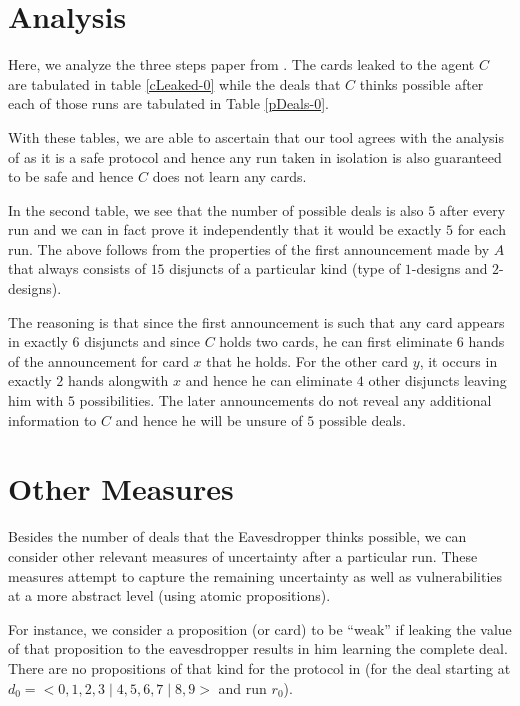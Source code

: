 \documentclass{article}
\begin{document}
\section{Analysis}

Here, we analyze the three steps paper from 
\cite{ditmarsch:2011}. The cards leaked to the
agent $C$ are tabulated in table \ref{cLeaked-0}
while the deals that $C$ thinks possible after
each of those runs are tabulated in Table \ref{pDeals-0}.

With these tables, we are able to ascertain that 
our tool agrees with the analysis of \cite{ditmarsch:2011}
as it is a safe protocol and hence any run taken in
isolation is also guaranteed to be safe and hence $C$
does not learn any cards.

\begin{table}[h]
\hfill \quad \hfill
\end{table}

In the second table, we see that the number of possible
deals is also $5$ after every run and we can in fact prove
it independently that it would be exactly $5$ for each run. 
The above follows from the properties of the first announcement
made by $A$ that always consists of $15$ disjuncts of a
particular kind (type of $1$-designs and $2$-designs). 

The reasoning is that since the first announcement
is such that any card appears in exactly $6$ disjuncts and since
$C$ holds two cards, he can first eliminate $6$ hands of the announcement
for card $x$ that he holds. For the other card $y$, it occurs
in exactly $2$ hands alongwith $x$ and hence he can eliminate
$4$ other disjuncts leaving him with $5$ possibilities. The
later announcements do not reveal any additional information to
$C$ and hence he will be unsure of $5$ possible deals.

\section{Other Measures}

Besides the number of deals that the Eavesdropper thinks possible, we can 
consider other relevant measures of uncertainty after a particular run. 
These measures attempt to capture the remaining uncertainty as well
as vulnerabilities at a more abstract level (using atomic propositions).

For instance, we consider a proposition (or card) to be ``weak'' if
leaking the value of that proposition to the eavesdropper results
in him learning the complete deal. There are no propositions of that kind
for the protocol in \cite{ditmarsch:2011} (for the deal starting 
at $d_0 = <0,1,2,3 \;|\; 4,5,6,7 \;|\; 8,9>$ and run $r_0$).
\end{document}
